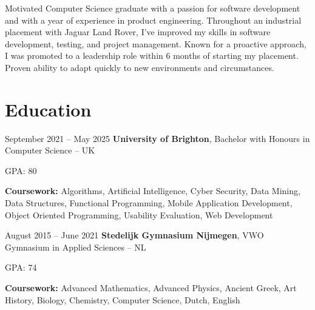 



	\newcommand{\AND}{\unskip
		\cleaders\copy\ANDbox\hskip\wd\ANDbox
		\ignorespaces
	}
	\newsavebox\ANDbox
	\sbox\ANDbox{$|$}
	
	
	
	\begin{onecolentry}
		Motivated Computer Science graduate with a passion for software development and with a year of experience in product engineering. Throughout an industrial placement with Jaguar Land Rover, I’ve improved my skills in software development, testing, and project management. Known for a proactive approach, I was promoted to a leadership role within 6 months of starting my placement. Proven ability to adapt quickly to new environments and circumstances.
	\end{onecolentry}

	
	\section{Education}
	
	
	\begin{twocolentry}{
			September 2021 – May 2025
		}
		\textbf{University of Brighton}, Bachelor with Honours in Computer Science -- UK
	\end{twocolentry}
	
	\vspace{0.10 cm}
	\begin{onecolentry}
		\begin{highlights}
			\item GPA: 80
			\item \textbf{Coursework:} Algorithms, Artificial Intelligence, Cyber Security, Data Mining, Data Structures, Functional Programming, Mobile Application Development, Object Oriented Programming, Usability Evaluation, Web Development
		\end{highlights}
	\end{onecolentry}
	
	\vspace{0.2 cm}
	
	\begin{twocolentry}{
			August 2015 – June 2021
		}
		\textbf{Stedelijk Gymnasium Nijmegen}, VWO Gymnasium in Applied Sciences -- NL
	\end{twocolentry}
	
	\vspace{0.10 cm}
	\begin{onecolentry}
		\begin{highlights}
			\item GPA: 74
			\item \textbf{Coursework:} Advanced Mathematics, Advanced Physics, Ancient Greek, Art History, Biology, Chemistry, Computer Science, Dutch, English
		\end{highlights}
	\end{onecolentry}
	
